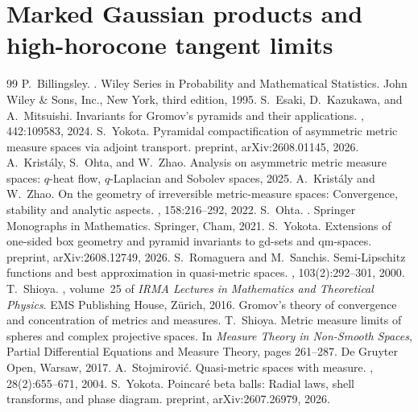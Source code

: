 \documentclass[10pt,a4paper]{amsart}
\numberwithin{equation}{section}
\begin{document}
\section{Marked Gaussian products and high-horocone tangent limits}\label{app:marked-product-proofs}


\begin{thebibliography}{99}
 P.~Billingsley. . \newblock Wiley Series in Probability and Mathematical Statistics. John Wiley \& Sons, Inc., New York, third edition, 1995.
 S.~Esaki, D.~Kazukawa, and A.~Mitsuishi. \newblock Invariants for {G}romov's pyramids and their applications. , 442:109583, 2024.
 S.~Yokota. \newblock Pyramidal compactification of asymmetric metric measure spaces via adjoint transport. \newblock preprint, arXiv:2608.01145, 2026.
 A.~Krist{\'a}ly, S.~Ohta, and W.~Zhao. \newblock Analysis on asymmetric metric measure spaces: {$q$}-heat flow, {$q$}-{Laplacian} and {Sobolev} spaces, 2025.
 A.~Krist{\'a}ly and W.~Zhao. \newblock On the geometry of irreversible metric-measure spaces: Convergence, stability and analytic aspects. , 158:216--292, 2022.
 S.~Ohta. . \newblock Springer Monographs in Mathematics. Springer, Cham, 2021.
 S.~Yokota. \newblock Extensions of one-sided box geometry and pyramid invariants to gd-sets and qm-spaces. \newblock preprint, arXiv:2608.12749, 2026.
 S.~Romaguera and M.~Sanchis. \newblock Semi-{Lipschitz} functions and best approximation in quasi-metric spaces. , 103(2):292--301, 2000.
 T.~Shioya. , volume~25 of {\em IRMA Lectures in Mathematics and Theoretical Physics}. \newblock EMS Publishing House, Z\"urich, 2016. \newblock Gromov's theory of convergence and concentration of metrics and measures.
 T.~Shioya. \newblock Metric measure limits of spheres and complex projective spaces. \newblock In {\em Measure Theory in Non-Smooth Spaces}, Partial Differential Equations and Measure Theory, pages 261--287. De Gruyter Open, Warsaw, 2017.
 A.~Stojmirovi{\'c}. \newblock Quasi-metric spaces with measure. , 28(2):655--671, 2004.
 S.~Yokota. \newblock Poincar\'e beta balls: Radial laws, shell transforms, and phase diagram. \newblock preprint, arXiv:2607.26979, 2026.
\end{thebibliography}
\end{document}
